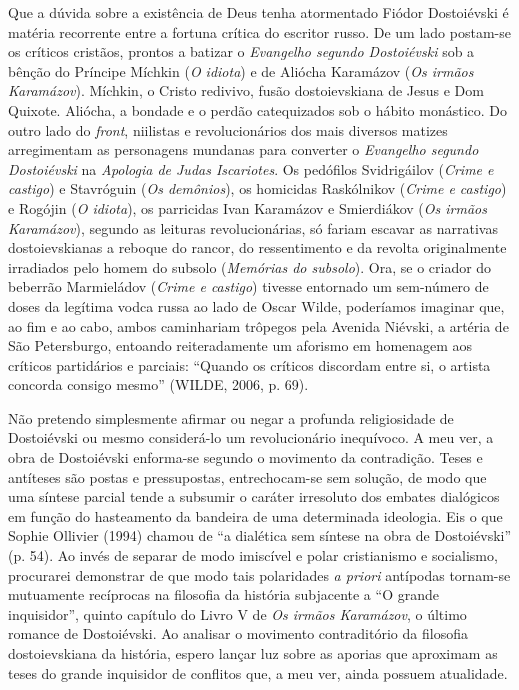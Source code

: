 Que a dúvida sobre a existência de Deus tenha atormentado Fiódor
Dostoiévski é matéria recorrente entre a fortuna crítica do escritor
russo. De um lado postam-se os críticos cristãos, prontos a batizar o
\emph{Evangelho segundo Dostoiévski} sob a bênção do Príncipe Míchkin
(\emph{O idiota}) e de Aliócha Karamázov (\emph{Os irmãos Karamázov}).
Míchkin, o Cristo redivivo, fusão dostoievskiana de Jesus e Dom Quixote.
Aliócha, a bondade e o perdão catequizados sob o hábito monástico. Do
outro lado do \emph{front}, niilistas e revolucionários dos mais
diversos matizes arregimentam as personagens mundanas para converter o
\emph{Evangelho segundo Dostoiévski} na \emph{Apologia de Judas
Iscariotes}. Os pedófilos Svidrigáilov (\emph{Crime e castigo}) e
Stavróguin (\emph{Os demônios}), os homicidas Raskólnikov (\emph{Crime e
castigo}) e Rogójin (\emph{O idiota}), os parricidas Ivan Karamázov e
Smierdiákov (\emph{Os irmãos Karamázov}), segundo as leituras
revolucionárias, só fariam escavar as narrativas dostoievskianas a
reboque do rancor, do ressentimento e da revolta originalmente
irradiados pelo homem do subsolo (\emph{Memórias do subsolo}). Ora, se o
criador do beberrão Marmieládov (\emph{Crime e castigo}) tivesse
entornado um sem-número de doses da legítima vodca russa ao lado de
Oscar Wilde, poderíamos imaginar que, ao fim e ao cabo, ambos
caminhariam trôpegos pela Avenida Niévski, a artéria de São Petersburgo,
entoando reiteradamente um aforismo em homenagem aos críticos
partidários e parciais: ``Quando os críticos discordam entre si, o
artista concorda consigo mesmo'' (WILDE, 2006, p. 69).

Não pretendo simplesmente afirmar ou negar a profunda religiosidade de
Dostoiévski ou mesmo considerá-lo um revolucionário inequívoco. A meu
ver, a obra de Dostoiévski enforma-se segundo o movimento da
contradição. Teses e antíteses são postas e pressupostas, entrechocam-se
sem solução, de modo que uma síntese parcial tende a subsumir o caráter
irresoluto dos embates dialógicos em função do hasteamento da bandeira
de uma determinada ideologia. Eis o que Sophie Ollivier (1994) chamou de
``a dialética sem síntese na obra de Dostoiévski'' (p. 54). Ao invés de
separar de modo imiscível e polar cristianismo e socialismo, procurarei
demonstrar de que modo tais polaridades \emph{a priori} antípodas
tornam-se mutuamente recíprocas na filosofia da história subjacente a
``O grande inquisidor'', quinto capítulo do Livro V de \emph{Os irmãos
Karamázov}, o último romance de Dostoiévski. Ao analisar o movimento
contraditório da filosofia dostoievskiana da história, espero lançar luz
sobre as aporias que aproximam as teses do grande inquisidor de
conflitos que, a meu ver, ainda possuem atualidade.

